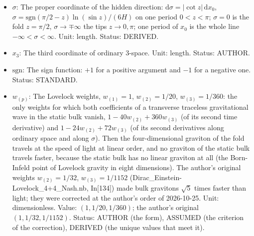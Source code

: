 \documentclass[
  10pt,
]{article}
\begin{document}
\begin{itemize}
\item
  \(\sigma\): The proper coordinate of the hidden direction:
  \(\mathrm{d}\sigma = \lvert\cot z\rvert\,\mathrm{d}x_0\),
  \(\sigma = \mathrm{sgn}(\pi/2 - z)\ln(\sin z)/(6H)\) on one period
  \(0 < z < \pi\); \(\sigma = 0\) is the fold \(z = \pi/2\),
  \(\sigma \to \mp\infty\) the tips \(z \to 0, \pi\); one period of
  \(x_0\) is the whole line \(-\infty < \sigma < \infty\). Unit: length.
  Status: DERIVED.
\item
  \(x_3\): The third coordinate of ordinary 3-space. Unit: length.
  Status: AUTHOR.
\item
  \(\mathrm{sgn}\): The sign function: \(+1\) for a positive argument
  and \(-1\) for a negative one. Status: STANDARD.
\item
  \(w_{(p)}\): The Lovelock weights, \(w_{(1)} = 1\),
  \(w_{(2)} = 1/20\), \(w_{(3)} = 1/360\): the only weights for which
  both coefficients of a transverse traceless gravitational wave in the
  static bulk vanish, \(1 - 40w_{(2)} + 360w_{(3)}\) (of its second time
  derivative) and \(1 - 24w_{(2)} + 72w_{(3)}\) (of its second
  derivatives along ordinary space and along \(\sigma\)). Then the
  four-dimensional graviton of the fold travels at the speed of light at
  linear order, and no graviton of the static bulk travels faster,
  because the static bulk has no linear graviton at all (the Born-Infeld
  point of Lovelock gravity in eight dimensions). The author's original
  weights \(w_{(2)} = 1/32\), \(w_{(3)} = 1/1152\)
  (Dirac\_Einstein-Lovelock\_4+4\_Nash.nb, In{[}134{]}) made bulk
  gravitons \(\sqrt5\) times faster than light; they were corrected at
  the author's order of 2026-10-25. Unit: dimensionless. Value:
  \((1, 1/20, 1/360)\); the author's original \((1, 1/32, 1/1152)\).
  Status: AUTHOR (the form), ASSUMED (the criterion of the correction),
  DERIVED (the unique values that meet it).
\end{itemize}
\end{document}
